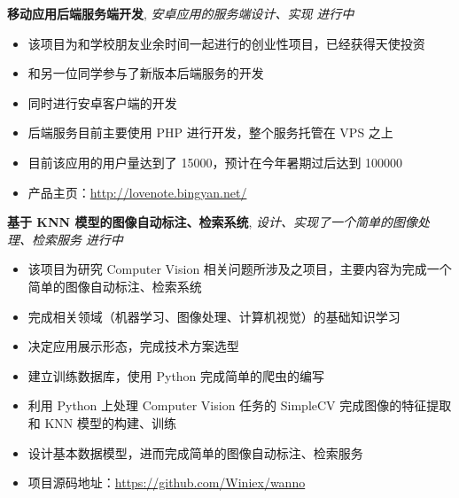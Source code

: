 \documentclass[9pt]{ctexart}
\newenvironment{changemargin}[2]{%
    \begin{list}{}{%
            \setlength{\topsep}{0pt}%
            \setlength{\leftmargin}{#1}%
            \setlength{\rightmargin}{#2}%
            \setlength{\listparindent}{\parindent}%
        \setlength{\itemindent}{\parindent}%
            \setlength{\parsep}{\parskip}%
        }%
  \item[]}{\end{list}
      }
\newenvironment{body} {
          \vspace*{-16pt}
          \begin{changemargin}{-0.25in}{-0.5in}
          }	
      {\end{changemargin}
      }
\begin{document}
      \begin{body}
          \vspace{14pt}

           \textbf{移动应用后端服务端开发}, \emph{安卓应用的服务端设计、实现} \hfill \emph{进行中}\\
          \vspace*{-4pt}
      \begin{itemize} \itemsep -0pt  %
              \item 该项目为和学校朋友业余时间一起进行的创业性项目，已经获得天使投资
              \item 和另一位同学参与了新版本后端服务的开发
              \item 同时进行安卓客户端的开发
              \item 后端服务目前主要使用 PHP 进行开发，整个服务托管在 VPS 之上
              \item 目前该应用的用户量达到了 15000，预计在今年暑期过后达到 100000
              \item 产品主页：\url{http://lovenote.bingyan.net/}
          \end{itemize}
          
          \textbf{基于 KNN 模型的图像自动标注、检索系统}, \emph{设计、实现了一个简单的图像处理、检索服务} \hfill \emph{进行中}\\
          \vspace*{-4pt}
      \begin{itemize} \itemsep -0pt  %
              \item 该项目为研究 Computer Vision 相关问题所涉及之项目，主要内容为完成一个简单的图像自动标注、检索系统
              \item 完成相关领域（机器学习、图像处理、计算机视觉）的基础知识学习
              \item 决定应用展示形态，完成技术方案选型
              \item 建立训练数据库，使用 Python 完成简单的爬虫的编写
              \item 利用 Python 上处理 Computer Vision 任务的 SimpleCV 完成图像的特征提取和 KNN 模型的构建、训练
              \item 设计基本数据模型，进而完成简单的图像自动标注、检索服务
              \item 项目源码地址：\url{https://github.com/Winiex/wanno}
          \end{itemize}
          

\end{body}
\end{document}
